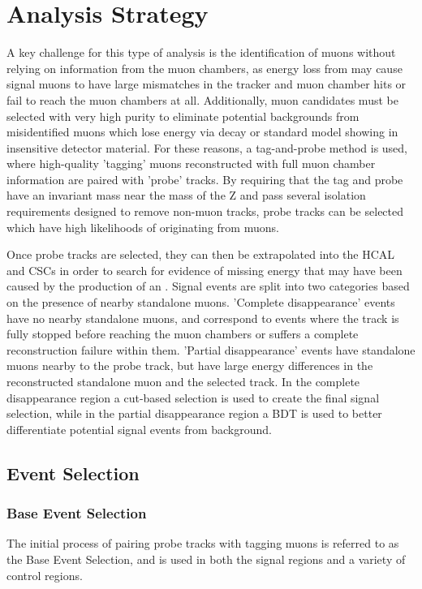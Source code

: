 \chapter{Analysis Strategy}
\label{analysis}
A key challenge for this type of analysis is the identification of muons without relying on information from the muon chambers, as energy loss from \dbrem may cause signal muons to have large mismatches in the tracker and muon chamber hits or fail to reach the muon chambers at all.
Additionally, muon candidates must be selected with very high purity to eliminate potential backgrounds from misidentified muons which lose energy via decay or standard model showing in insensitive detector material.
For these reasons, a tag-and-probe method is used, where high-quality 'tagging' muons reconstructed with full muon chamber information are paired with 'probe' tracks.
By requiring that the tag and probe have an invariant mass near the mass of the Z and pass several isolation requirements designed to remove non-muon tracks, probe tracks can be selected which have high likelihoods of originating from muons.

Once probe tracks are selected, they can then be extrapolated into the HCAL and CSCs in order to search for evidence of missing energy that may have been caused by the production of an \aprime.
Signal events are split into two categories based on the presence of nearby standalone muons.
'Complete disappearance' events have no nearby standalone muons, and correspond to events where the track is fully stopped before reaching the muon chambers or suffers a complete reconstruction failure within them.
'Partial disappearance' events have standalone muons nearby to the probe track, but have large energy differences in the reconstructed standalone muon and the selected track.
In the complete disappearance region a cut-based selection is used to create the final signal selection, while in the partial disappearance region a BDT is used to better differentiate potential signal events from background.

\section{Event Selection}
\subsection{Base Event Selection}
The initial process of pairing probe tracks with tagging muons is referred to as the Base Event Selection, and is used in both the signal regions and a variety of control regions.

